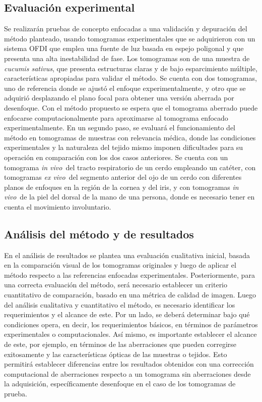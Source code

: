 \documentclass[letter, 12 pt]{article}
\newcommand{\invi}{\textit{in vivo}\ }
\newcommand{\exvi}{\textit{ex vivo}\ }
\begin{document}
	\subsection{Evaluación experimental}
Se realizarán pruebas de concepto enfocadas a una validación y depuración del método planteado, usando tomogramas experimentales que se adquirieron con un sistema OFDI que emplea una fuente de luz basada en espejo poligonal y que presenta una alta inestabilidad de fase. Los tomogramas son de una muestra de \textit{cucumis sativus}, que presenta estructuras claras y de bajo esparcimiento múltiple, características apropiadas para validar el método. Se cuenta con dos tomogramas, uno de referencia donde se ajustó el enfoque experimentalmente, y otro que se adquirió desplazando el plano focal para obtener una versión aberrada por desenfoque. Con el método propuesto se espera que el tomograma aberrado puede enfocarse computacionalmente para aproximarse al tomograma enfocado experimentalmente. En un segundo paso, se evaluará el funcionamiento del método en tomogramas de muestras con relevancia médica, donde las condiciones experimentales y la naturaleza del tejido mismo imponen dificultades para su operación en comparación con los dos casos anteriores. Se cuenta con un tomograma \invi del tracto respiratorio de un cerdo empleando un catéter, con tomogramas \exvi del segmento anterior del ojo de un cerdo con diferentes planos de enfoques en la región de la cornea y del iris, y con tomogramas \invi de la piel del dorsal de la mano de una persona, donde es necesario tener en cuenta el movimiento involuntario.

    \subsection{Análisis del método y de resultados}
En el análisis de resultados se plantea una evaluación cualitativa inicial, basada en la comparación visual de los tomogramas originales y luego de aplicar el método respecto a las referencias enfocadas experimentales. Posteriormente, para una correcta evaluación del método, será necesario establecer un criterio cuantitativo de comparación, basado en una métrica de calidad de imagen. Luego del análisis cualitativa y cuantitativo el método, es necesario identificar los requerimientos y el alcance de este. Por un lado, se deberá determinar bajo qué condiciones opera, en decir, los requerimientos básicos, en términos de parámetros experimentales o computacionales. Así mismo, es importante establecer el alcance de este, por ejemplo, en términos de las aberraciones que pueden corregirse exitosamente y las características ópticas de las muestras o tejidos. Esto permitirá establecer diferencias entre los resultados obtenidos con una corrección computacional de aberraciones respecto a un tomograma sin aberraciones desde la adquisición, específicamente desenfoque en el caso de los tomogramas de prueba.
\end{document}

